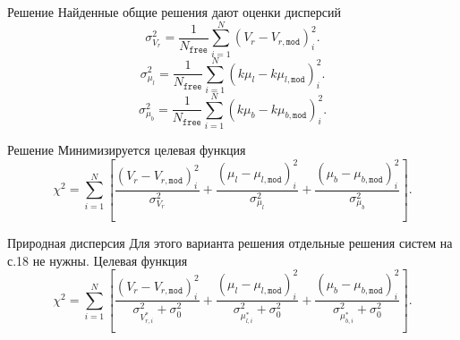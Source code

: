 \documentclass{beamer}
\begin{document}
\begin{frame}{Решение}
	Найденные общие решения дают оценки дисперсий
	\begin{equation}
                \sigma^2_{V_r} = \frac{1}{N_{\texttt{free}}} \sum^N_{i = 1} \left( V_r - V_{r, \texttt{mod}} \right)^2_i.
	\end{equation}
	\begin{equation}
                \sigma^2_{\mu_l} = \frac{1}{N_{\texttt{free}}} \sum^N_{i = 1} \left( k\mu_l - k\mu_{l, \texttt{mod}} \right)^2_i.
	\end{equation}
	\begin{equation}
                \sigma^2_{\mu_b} = \frac{1}{N_{\texttt{free}}} \sum^N_{i = 1} \left( k\mu_b - k\mu_{b, \texttt{mod}} \right)^2_i.
	\end{equation}
\end{frame}

\begin{frame}{Решение}
	Минимизируется целевая функция
	\begin{equation}
                \chi^2 = \sum^N_{i = 1} \left[ \frac{\left( V_r - V_{r, \texttt{mod}} \right)^2_i}{\sigma^2_{V_r}} + \frac{\left( \mu_l - \mu_{l, \texttt{mod}} \right)^2_i}{\sigma^2_{\mu_l}} + \frac{\left( \mu_b - \mu_{b, \texttt{mod}} \right)^2_i}{\sigma^2_{\mu_b}} \right].
	\end{equation}
\end{frame}


\begin{frame}{Природная дисперсия}
	Для этого варианта решения отдельные решения систем на с.18 не нужны. Целевая функция
	\begin{equation}
                \chi^2 = \sum^N_{i = 1} \left[ \frac{\left( V_r - V_{r, \texttt{mod}} \right)^2_i}{\sigma^2_{V_{r, i}^*} + \sigma^2_0} + \frac{\left( \mu_l - \mu_{l, \texttt{mod}} \right)^2_i}{\sigma^2_{\mu_{l,i}^{*}} + \sigma^2_0} + \frac{\left( \mu_b - \mu_{b, \texttt{mod}} \right)^2_i}{\sigma^2_{\mu_{b,i}^{*}} + \sigma^2_0} \right].
	\end{equation}
\end{frame}
\end{document}
